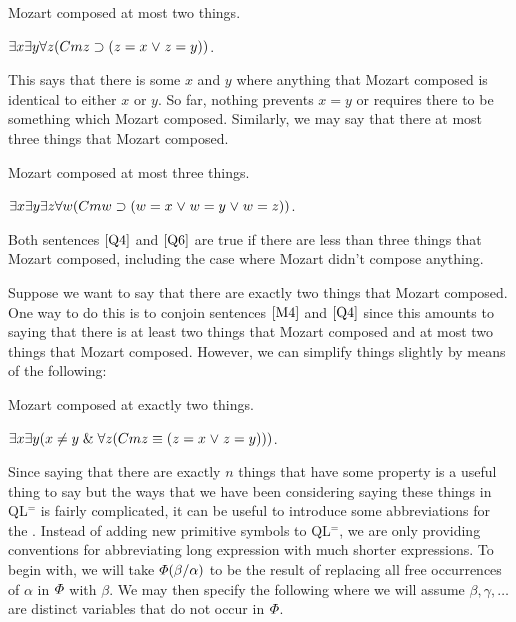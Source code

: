 \begin{earg}
  \item[\ex{Q3}] Mozart composed at most two things.
  \item[\ex{Q4}] $\exists x\exists y\forall z(Cmz \supset (z= x \mkern1mu\vee\mkern1mu z= y))$.
\end{earg}

This says that there is some $x$ and $y$ where anything that Mozart composed is identical to either $x$ or $y$. 
So far, nothing prevents $x=y$ or requires there to be something which Mozart composed. 
Similarly, we may say that there at most three things that Mozart composed.

\begin{earg}
  \item[\ex{Q5}] Mozart composed at most three things.
  \item[\ex{Q6}] $\exists x\exists y\exists z\forall w(Cmw \supset (w = x \mkern1mu\vee\mkern1mu w = y \mkern1mu\vee\mkern1mu w = z))$.
\end{earg}

Both sentences $\ref{Q4}$ and $\ref{Q6}$ are true if there are less than three things that Mozart composed, including the case where Mozart didn't compose anything.

Suppose we want to say that there are exactly two things that Mozart composed.
One way to do this is to conjoin sentences $\ref{M4}$ and $\ref{Q4}$ since this amounts to saying that there is at least two things that Mozart composed and at most two things that Mozart composed. 
However, we can simplify things slightly by means of the following:

\begin{earg}
  \item[\ex{Q7}] Mozart composed at exactly two things.
  \item[\ex{Q8}] $\exists x\exists y(x \neq y \mathrel\& \forall z(Cmz \equiv (z = x \mkern1mu\vee\mkern1mu z = y)))$.
\end{earg}

Since saying that there are exactly $n$ things that have some property is a useful thing to say but the ways that we have been considering saying these things in QL$^=$ is fairly complicated, it can be useful to introduce some abbreviations for the .
Instead of adding new primitive symbols to QL$^=$, we are only providing conventions for abbreviating long expression with much shorter expressions.
To begin with, we will take $\varPhi(\beta/\alpha)$ to be the result of replacing all free occurrences of $\alpha$ in $\varPhi$ with $\beta$.
We may then specify the following where we will assume $\beta, \gamma, \ldots$ are distinct variables that do not occur in $\varPhi$.

